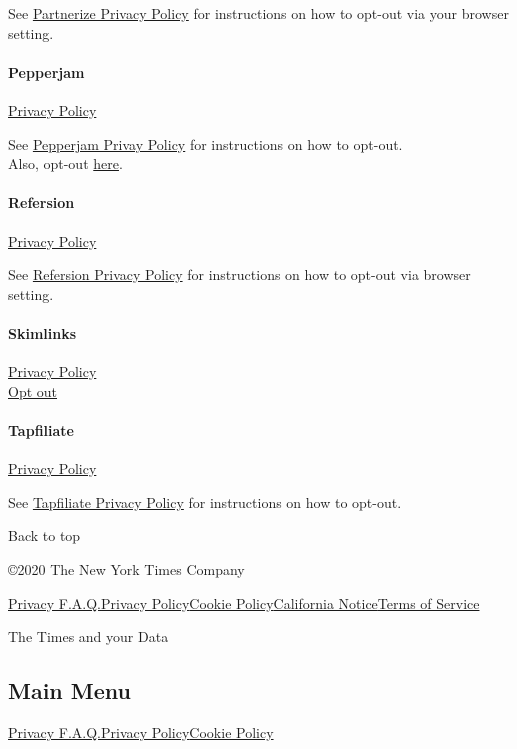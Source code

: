 See \href{https://partnerize.com/en/privacy-policy}{Partnerize Privacy
Policy} for instructions on how to opt-out via your browser setting.

\hypertarget{pepperjam}{%
\paragraph{Pepperjam}\label{pepperjam}}

\href{https://www.pepperjam.com/legal\#privacy}{Privacy Policy}

See \href{https://www.idevdirect.com/policies.php}{Pepperjam Privay
Policy} for instructions on how to opt-out.\\
Also, opt-out \href{http://www.aboutads.info/choices/}{here}.

\hypertarget{refersion}{%
\paragraph{Refersion}\label{refersion}}

\href{https://www.refersion.com/privacy}{Privacy Policy}

See \href{https://www.refersion.com/privacy}{Refersion Privacy Policy}
for instructions on how to opt-out via browser setting.

\hypertarget{skimlinks}{%
\paragraph{Skimlinks}\label{skimlinks}}

\href{https://skimlinks.com/privacy-policies/}{Privacy Policy}\\
\href{https://optout.skimlinks.com/?tested=1}{Opt out}

\hypertarget{tapfiliate}{%
\paragraph{Tapfiliate}\label{tapfiliate}}

\href{https://tapfiliate.com/privacy/privacy-policy/}{Privacy Policy}

See \href{https://tapfiliate.com/privacy/privacy-policy/}{Tapfiliate
Privacy Policy} for instructions on how to opt-out.

Back to top

©2020 The New York Times Company

\href{/privacy}{Privacy F.A.Q.}\href{/privacy/privacy-policy}{Privacy
Policy}\href{/privacy/cookie-policy}{Cookie
Policy}\href{/privacy/california-notice}{California
Notice}\href{https://help.nytimes.com/hc/en-us/articles/115014893428-Terms-of-service}{Terms
of Service}

The Times and your Data

\hypertarget{main-menu}{%
\subsection{Main Menu}\label{main-menu}}

\href{/privacy}{Privacy F.A.Q.}\href{/privacy/privacy-policy}{Privacy
Policy}\href{/privacy/cookie-policy}{Cookie Policy}
